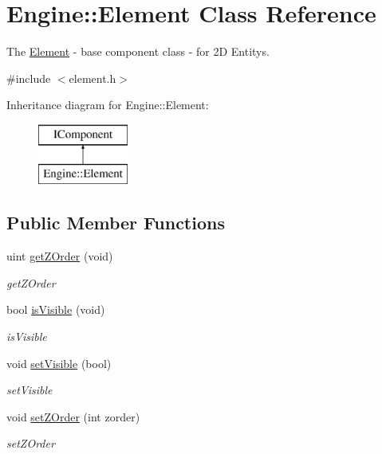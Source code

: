 \hypertarget{classEngine_1_1Element}{}\section{Engine\+:\+:Element Class Reference}
\label{classEngine_1_1Element}


The \hyperlink{classEngine_1_1Element}{Element} -\/ base component class -\/ for 2\+D Entitys.  




{\ttfamily \#include $<$element.\+h$>$}

Inheritance diagram for Engine\+:\+:Element\+:\begin{figure}[H]
\begin{center}
\leavevmode
\includegraphics[height=2.000000cm]{classEngine_1_1Element}
\end{center}
\end{figure}
\subsection*{Public Member Functions}
\begin{DoxyCompactItemize}
\item 
uint \hyperlink{classEngine_1_1Element_a075b3f0f789c82b0f62444024ebc546d}{get\+Z\+Order} (void)
\begin{DoxyCompactList}\small\item\em get\+Z\+Order \end{DoxyCompactList}\item 
bool \hyperlink{classEngine_1_1Element_a143f4e6a395c96ee7f175e179272795b}{is\+Visible} (void)
\begin{DoxyCompactList}\small\item\em is\+Visible \end{DoxyCompactList}\item 
void \hyperlink{classEngine_1_1Element_a0cd1e777e57ac0717a0cdea484f66708}{set\+Visible} (bool)
\begin{DoxyCompactList}\small\item\em set\+Visible \end{DoxyCompactList}\item 
void \hyperlink{classEngine_1_1Element_aa43ecc291745829889ec923fe8d0ff76}{set\+Z\+Order} (int zorder)
\begin{DoxyCompactList}\small\item\em set\+Z\+Order \end{DoxyCompactList}\end{DoxyCompactItemize}



